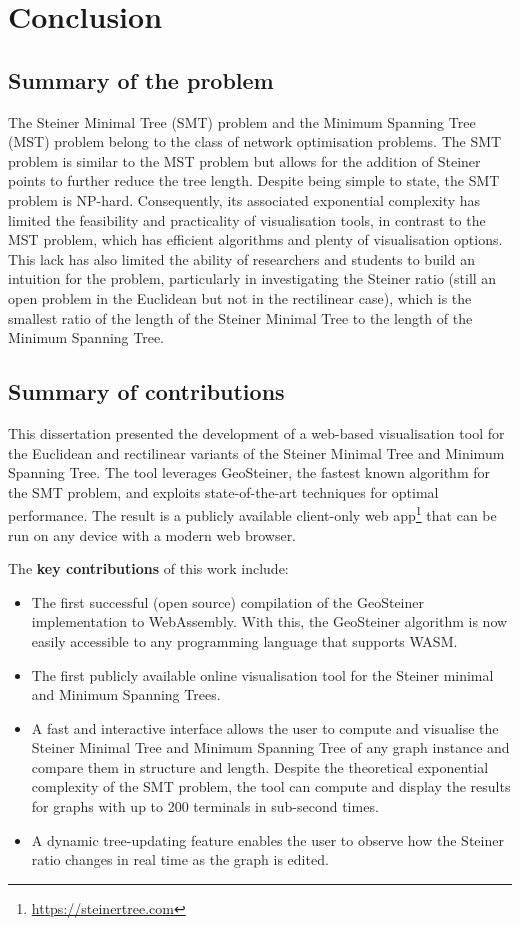 \documentclass{l4proj}
\begin{document}
\chapter{Conclusion}
\label{sec:conclusion}
\section{Summary of the problem}
The Steiner Minimal Tree (SMT) problem and the Minimum Spanning Tree (MST) problem belong to the class of network optimisation problems. The SMT problem is similar to the MST problem but allows for the addition of Steiner points to further reduce the tree length.
Despite being simple to state, the SMT problem is NP-hard. Consequently, its associated exponential complexity has limited the feasibility and practicality of visualisation tools, in contrast to the MST problem, which has efficient algorithms and plenty of visualisation options. This lack has also limited the ability of researchers and students to build an intuition for the problem, particularly in investigating the Steiner ratio (still an open problem in the Euclidean but not in the rectilinear case), which is the smallest ratio of the length of the Steiner Minimal Tree to the length of the Minimum Spanning Tree.

\section{Summary of contributions}
This dissertation presented the development of a web-based visualisation tool for the Euclidean and rectilinear variants of the Steiner Minimal Tree and Minimum Spanning Tree. The tool leverages GeoSteiner, the fastest known algorithm for the SMT problem, and exploits state-of-the-art techniques for optimal performance.
The result is a publicly available client-only web app\footnote{\url{https://steinertree.com}} that can be run on any device with a modern web browser.

The \textbf{key contributions} of this work include:
\begin{itemize}
    \item The first successful (open source) compilation of the GeoSteiner implementation to WebAssembly. With this, the GeoSteiner algorithm is now easily accessible to any programming language that supports WASM.
    \item The first publicly available online visualisation tool for the Steiner minimal and Minimum Spanning Trees.
    \item A fast and interactive interface allows the user to compute and visualise the Steiner Minimal Tree and Minimum Spanning Tree of any graph instance and compare them in structure and length. Despite the theoretical exponential complexity of the SMT problem, the tool can compute and display the results for graphs with up to 200 terminals in sub-second times.
    \item A dynamic tree-updating feature enables the user to observe how the Steiner ratio changes in real time as the graph is edited.
\end{itemize}
\end{document}

